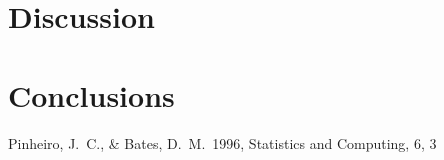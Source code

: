 \documentclass[preprint]{aastex}
\begin{document}


\section{Discussion}
\label{sec:discussion}





 



\section{Conclusions}
\label{sec:conclusions}



\begin{thebibliography}{}
 Pinheiro, J.~C., \& Bates, D.~M.\ 1996, Statistics and Computing, 6, 3


\end{thebibliography}
\end{document}
